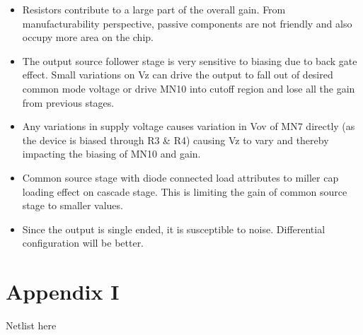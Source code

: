 \documentclass[12pt,a4paper]{article}
\begin{document}
\begin{itemize}
\item Resistors contribute to a large part of the overall gain. From 
manufacturability perspective, passive components are not friendly and 
also occupy more area on the chip.
\item The output source follower stage is very sensitive to biasing due 
to back gate effect. Small variations on Vz can drive the output to fall 
out of desired common mode voltage or drive MN10 into cutoff region and 
lose all the gain from previous stages.
\item Any variations in supply voltage causes variation in Vov of MN7 
directly (as the device is biased through R3 \& R4) causing Vz to vary 
and thereby impacting the biasing of MN10 and gain.
\item Common source stage with diode connected load attributes to miller 
cap loading effect on cascade stage. This is limiting the gain of common 
source stage to smaller values.
\item Since the output is single ended, it is susceptible to noise. 
Differential configuration will be better.
\end{itemize}

\pagebreak



\section{Appendix I}
Netlist here
\end{document}
